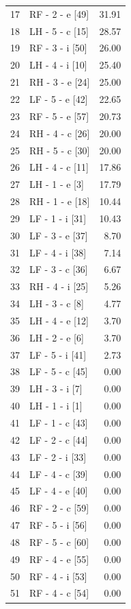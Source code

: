 \documentclass[11pt,a4paper]{article}
\begin{document}
\begin{longtable}{@{}rlr@{}}
    17 & RF - 2 - e [49] & 31.91 \\
    18 & LH - 5 - c [15] & 28.57 \\
    19 & RF - 3 - i [50] & 26.00 \\
    20 & LH - 4 - i [10] & 25.40 \\
    21 & RH - 3 - e [24] & 25.00 \\
    22 & LF - 5 - e [42] & 22.65 \\
    23 & RF - 5 - e [57] & 20.73 \\
    24 & RH - 4 - c [26] & 20.00 \\
    25 & RH - 5 - c [30] & 20.00 \\
    26 & LH - 4 - c [11] & 17.86 \\
    27 & LH - 1 - e [3] & 17.79 \\
    28 & RH - 1 - e [18] & 10.44 \\
    29 & LF - 1 - i [31] & 10.43 \\
    30 & LF - 3 - e [37] & 8.70 \\
    31 & LF - 4 - i [38] & 7.14 \\
    32 & LF - 3 - c [36] & 6.67 \\
    33 & RH - 4 - i [25] & 5.26 \\
    34 & LH - 3 - c [8] & 4.77 \\
    35 & LH - 4 - e [12] & 3.70 \\
    36 & LH - 2 - e [6] & 3.70 \\
    37 & LF - 5 - i [41] & 2.73 \\
    38 & LF - 5 - c [45] & 0.00 \\
    39 & LH - 3 - i [7] & 0.00 \\
    40 & LH - 1 - i [1] & 0.00 \\
    41 & LF - 1 - c [43] & 0.00 \\
    42 & LF - 2 - c [44] & 0.00 \\
    43 & LF - 2 - i [33] & 0.00 \\
    44 & LF - 4 - c [39] & 0.00 \\
    45 & LF - 4 - e [40] & 0.00 \\
    46 & RF - 2 - c [59] & 0.00 \\
    47 & RF - 5 - i [56] & 0.00 \\
    48 & RF - 5 - c [60] & 0.00 \\
    49 & RF - 4 - e [55] & 0.00 \\
    50 & RF - 4 - i [53] & 0.00 \\
    51 & RF - 4 - c [54] & 0.00 \\

\end{longtable}
\end{document}
